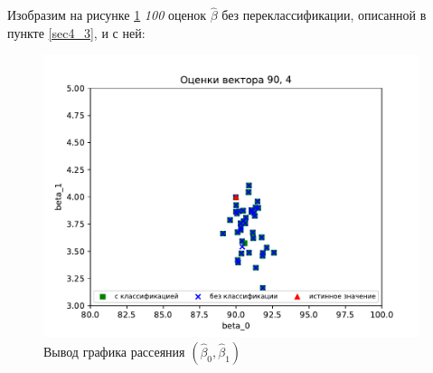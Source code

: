 \documentclass[a4paper,14pt]{extarticle}
\begin{document}
Изобразим на рисунке \ref{pic_3} \textit{100} оценок $\hat{\beta}$ без переклассификации, описанной в пункте \ref{sec4_3}, и с ней:\hfill\break
\begin{figure}[h]
    \centering
    \includegraphics[width=110mm]{pics/plot_90_4_with-without_(3).pdf}
    \caption{Вывод графика рассеяния $(\hat{\beta}_0,\hat{\beta}_1)$\label{overflow}}
    \label{pic_3}
\end{figure}
\break
\end{document}
